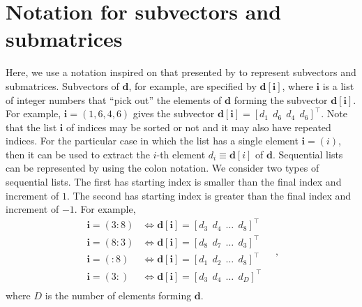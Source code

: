 \section{Notation for subvectors and submatrices}

Here, we use a notation inspired on that presented by \citet[][p. 4]{vanloan1992} to represent subvectors and submatrices.
Subvectors of $\mathbf{d}$, for example, are specified by $\mathbf{d}[\mathbf{i}]$, where $\mathbf{i}$ is a
list of integer numbers that ``pick out'' the elements of $\mathbf{d}$ forming the subvector $\mathbf{d}[\mathbf{i}]$.
For example, $\mathbf{i} = (1, 6, 4, 6)$ gives the subvector $\mathbf{d}[\mathbf{i}] = [ d_{1} \:\: d_{6} \:\: d_{4} \:\: d_{6} ]^{\top} $.
Note that the list $\mathbf{i}$ of indices may be sorted or not and it may also have repeated indices.
For the particular case in which the list has a single element $\mathbf{i} = (i)$, then it can be used to extract the $i$-th element 
$d_{i} \equiv \mathbf{d}[i]$ of $\mathbf{d}$.
Sequential lists can be represented by using the colon notation. We consider two types of sequential lists. The first has starting index is smaller than the final index and increment of $1$. The second has starting index is greater than the final index and increment of $-1$. For example, 
\begin{equation*}
	\begin{split}
		\mathbf{i} = (3:8) &\Leftrightarrow \mathbf{d}[\mathbf{i}] = [ d_{3} \:\: d_{4} \:\: \dots \:\: d_{8} ]^{\top} \\
		\mathbf{i} = (8:3) &\Leftrightarrow \mathbf{d}[\mathbf{i}] = [ d_{8} \:\: d_{7} \:\: \dots \:\: d_{3} ]^{\top} \\
		\mathbf{i} = (:8) &\Leftrightarrow \mathbf{d}[\mathbf{i}] = [ d_{1} \:\: d_{2} \:\: \dots \:\: d_{8} ]^{\top} \\
		\mathbf{i} = (3:) &\Leftrightarrow \mathbf{d}[\mathbf{i}] = [ d_{3} \:\: d_{4} \:\: \dots \:\: d_{D} ]^{\top} \\
	\end{split} \quad ,
\end{equation*}
where $D$ is the number of elements forming $\mathbf{d}$.

